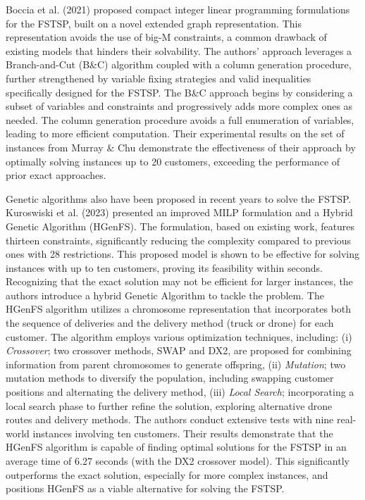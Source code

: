 \documentclass{article}
\begin{document}
	\par
 	Boccia et al. (2021) \cite{Boccia2021} proposed compact integer linear programming formulations for the FSTSP, built on a novel extended graph representation. This representation avoids the use of big-M constraints, a common drawback of existing models that hinders their solvability. The authors' approach leverages a Branch-and-Cut (B\&C) algorithm coupled with a column generation procedure, further strengthened by variable fixing strategies and valid inequalities specifically designed for the FSTSP. The B\&C approach begins by considering a subset of variables and constraints and progressively adds more complex ones as needed. The column generation procedure avoids a full enumeration of variables, leading to more efficient computation. Their experimental results on the set of instances from Murray \& Chu demonstrate the effectiveness of their approach by optimally solving instances up to 20 customers, exceeding the performance of prior exact approaches.
	\par
	Genetic algorithms also have been proposed in recent years to solve the FSTSP. Kuroswiski et al. (2023) \cite{Kuroswiski2023} presented an improved MILP formulation and a Hybrid Genetic Algorithm (HGenFS). The formulation, based on existing work, features thirteen constraints, significantly reducing the complexity compared to previous ones with 28 restrictions. This proposed model is shown to be effective for solving instances with up to ten customers, proving its feasibility within seconds. Recognizing that the exact solution may not be efficient for larger instances, the authors introduce a hybrid Genetic Algorithm to tackle the problem. The HGenFS algorithm utilizes a chromosome representation that incorporates both the sequence of deliveries and the delivery method (truck or drone) for each customer. The algorithm employs various optimization techniques, including:  (i) \textit{Crossover}; two crossover methods, SWAP and DX2, are proposed for combining information from parent chromosomes to generate offspring, (ii) \textit{Mutation}; two mutation methods to diversify the population, including swapping customer positions and alternating the delivery method, (iii) \textit{Local Search}; incorporating a local search phase to further refine the solution, exploring alternative drone routes and delivery methods. The authors conduct extensive tests with nine real-world instances involving ten customers. Their results demonstrate that the HGenFS algorithm is capable of finding optimal solutions for the FSTSP in an average time of 6.27 seconds (with the DX2 crossover model). This significantly outperforms the exact solution, especially for more complex instances, and positions HGenFS as a viable alternative for solving the FSTSP.
\end{document}
